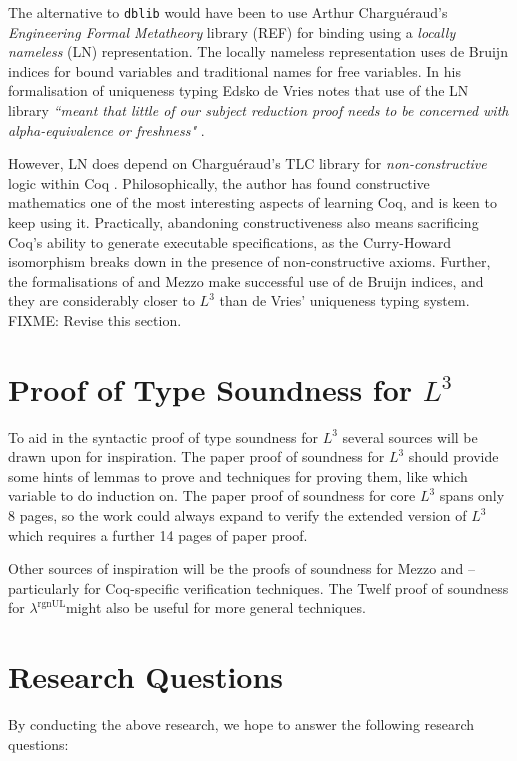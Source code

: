 \documentclass[]{unswthesis}
\newcommand{\rgnUL}{$\lambda^\text{rgnUL}$\text{ }}
\newcommand{\SSPHS}{\text{SSPHS }}
\begin{document}
The alternative to \texttt{dblib} would have been to use Arthur Chargu\'{e}raud's \textit{Engineering Formal Metatheory} library (REF) for binding using a \textit{locally nameless} (LN) representation. The locally nameless representation uses de Bruijn indices for bound variables and traditional names for free variables. In his formalisation of uniqueness typing Edsko de Vries notes that use of the LN library \textit{``meant that little of our subject reduction proof needs to be concerned with alpha-equivalence or freshness"} \cite{deVries08}.

However, LN does depend on Chargu\'{e}raud's TLC library for \textit{non-constructive} logic within Coq \cite{tlc15}. Philosophically, the author has found constructive mathematics one of the most interesting aspects of learning Coq, and is keen to keep using it. Practically, abandoning constructiveness also means sacrificing Coq's ability to generate executable specifications, as the Curry-Howard isomorphism breaks down in the presence of non-constructive axioms. Further, the formalisations of \SSPHS and Mezzo make successful use of de Bruijn indices, and they are considerably closer to $L^3$ than de Vries' uniqueness typing system. FIXME: Revise this section.

\section{Proof of Type Soundness for $L^3$}
\label{sec:proof_proposal}

To aid in the syntactic proof of type soundness for $L^3$ several sources will be drawn upon for inspiration. The paper proof of soundness for $L^3$ should provide some hints of lemmas to prove and techniques for proving them, like which variable to do induction on. The paper proof of soundness for core $L^3$ spans only 8 pages, so the work could always expand to verify the extended version of $L^3$ which requires a further 14 pages of paper proof.

Other sources of inspiration will be the proofs of soundness for Mezzo and \SSPHS -- particularly for Coq-specific verification techniques. The Twelf proof of soundness for \rgnUL might also be useful for more general techniques.

\section{Research Questions}

By conducting the above research, we hope to answer the following research questions:
\end{document}
